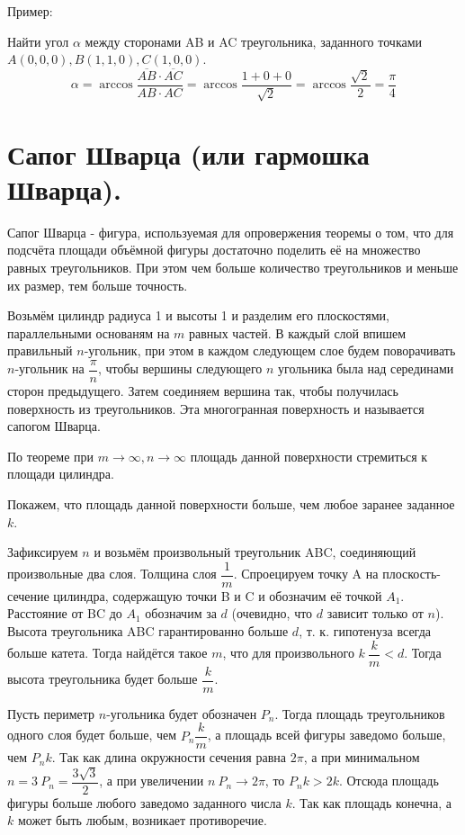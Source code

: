 \documentclass[12pt]{article}
\begin{document}
\begin{sloppypar}
    Пример:

    Найти угол $\alpha$ между сторонами AB и AC треугольника, заданного точками $A(0, 0, 0), B(1, 1, 0), C(1, 0, 0)$.
    \[
        \alpha = \arccos{\dfrac{\overline{AB} \cdot \overline{AC}}{AB \cdot AC}} = \arccos{\dfrac{1 + 0 + 0}{\sqrt{2}}} = \arccos{\dfrac{\sqrt{2}}{2}} = \dfrac{\pi}{4}
    \]

    \section{Сапог Шварца (или гармошка Шварца).}
    Сапог Шварца - фигура, используемая для опровержения теоремы о том, что для подсчёта площади объёмной фигуры достаточно поделить её на множество равных треугольников. При этом чем больше количество треугольников и меньше их размер, тем больше точность.

    Возьмём цилиндр радиуса 1 и высоты 1 и разделим его плоскостями, параллельными основаням на $m$ равных частей. В каждый слой впишем правильный $n$-угольник, при этом в каждом следующем слое будем поворачивать $n$-угольник на $\dfrac{\pi}{n}$, чтобы вершины следующего $n$ угольника была над серединами сторон предыдущего. Затем соединяем вершина так, чтобы получилась поверхность из треугольников. Эта многогранная поверхность и называется сапогом Шварца.

    По теореме при $m \rightarrow \infty, n \rightarrow \infty$ площадь данной поверхности стремиться к площади цилиндра.

    Покажем, что площадь данной поверхности больше, чем любое заранее заданное $k$.

    Зафиксируем $n$ и возьмём произвольный треугольник ABC, соединяющий произвольные два слоя. Толщина слоя $\dfrac{1}{m}$. Спроецируем точку A на плоскость-сечение цилиндра, содержащую точки B и C и обозначим её точкой $A_1$. Расстояние от BC до $A_1$ обозначим за $d$ (очевидно, что $d$ зависит только от $n$). Высота треугольника ABC гарантированно больше $d$, т. к. гипотенуза всегда больше катета. Тогда найдётся такое $m$, что для произвольного $k \ \dfrac{k}{m} < d$. Тогда высота треугольника будет больше $\dfrac{k}{m}$.

    Пусть периметр $n$-угольника будет обозначен $P_n$. Тогда площадь треугольников одного слоя будет больше, чем $P_n\dfrac{k}{m}$, а площадь всей фигуры заведомо больше, чем $P_n k$. Так как длина окружности сечения равна $2\pi$, а при минимальном $n = 3\ P_n = \dfrac{3\sqrt{3}}{2}$, а при увеличении $n\ P_n \rightarrow 2\pi$, то $P_n k > 2k$. Отсюда площадь фигуры больше любого заведомо заданного числа $k$. Так как площадь конечна, а $k$ может быть любым, возникает противоречие.


\end{sloppypar}
\end{document}
